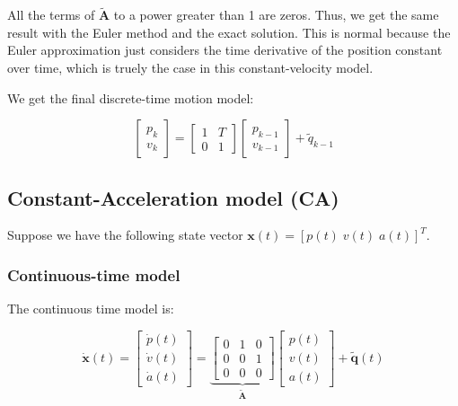 All the terms of $\mathbf{\tilde{A}}$ to a power greater than 1 are zeros. Thus, we get the same result with the Euler method and the exact solution. This is normal because the Euler approximation just considers the time derivative of the position constant over time, which is truely the case in this constant-velocity model.

We get the final discrete-time motion model:

\begin{equation}
    \left[\begin{array}{c}
        p_k \\
        v_k 
    \end{array}\right] = \left[\begin{array}{cc}
        1 & T \\
        0 & 1
    \end{array}\right]\left[\begin{array}{c}
        p_{k-1} \\
        v_{k-1} 
    \end{array}\right] + \tilde{q}_{k-1}
\end{equation}

\subsection{Constant-Acceleration model (CA)}

Suppose we have the following state vector $\mathbf{x}(t) = [p(t) \; v(t) \; a(t)]^T$.

\subsubsection{Continuous-time model}
The continuous time model is:

\begin{equation}
    \mathbf{\dot{x}}(t) = 
    \left[ \begin{array}{c}
        \dot{p}(t) \\
        \dot{v}(t) \\
        \dot{a}(t)
    \end{array}\right] = \underbrace{\left[\begin{array}{ccc}
        0 & 1 & 0 \\
        0 & 0 & 1 \\
        0 & 0 & 0
    \end{array}\right]}_{\mathbf{\tilde{A}}} \left[\begin{array}{c}
        p(t) \\
        v(t) \\
        a(t)
    \end{array}\right] + \mathbf{\tilde{q}}(t)
\end{equation}

